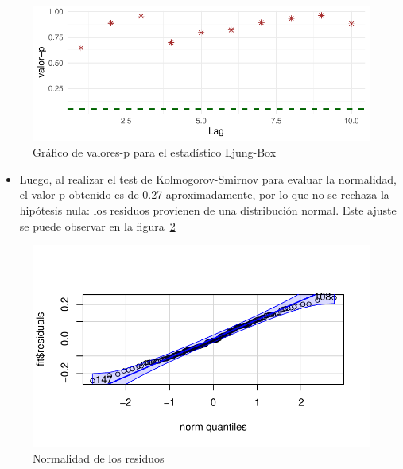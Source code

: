\documentclass[
  letterpaper,
  DIV=11,
  numbers=noendperiod,
  twocolumn]{scrartcl}
\providecommand{\tightlist}{%
  \setlength{\itemsep}{0pt}\setlength{\parskip}{0pt}}\usepackage{longtable,booktabs,array}
\begin{document}
\begin{figure}[H]

{\centering \includegraphics{pdf_tarea2_files/figure-pdf/fig-exp6-1.pdf}

}

\caption{\label{fig-exp6}Gráfico de valores-p para el estadístico
Ljung-Box}

\end{figure}

\begin{itemize}
\tightlist
\item
  Luego, al realizar el test de Kolmogorov-Smirnov para evaluar la
  normalidad, el valor-p obtenido es de 0.27 aproximadamente, por lo que
  no se rechaza la hipótesis nula: los residuos provienen de una
  distribución normal. Este ajuste se puede observar en la
  figura~\ref{fig-exp7}
\end{itemize}

\begin{figure}[H]

{\centering \includegraphics{pdf_tarea2_files/figure-pdf/fig-exp7-1.pdf}

}

\caption{\label{fig-exp7}Normalidad de los residuos}

\end{figure}
\end{document}

